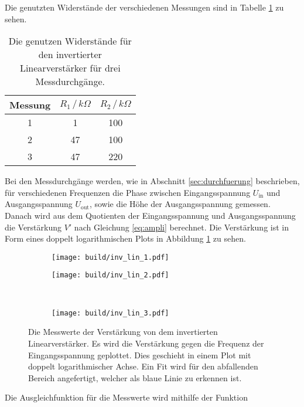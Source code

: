 Die genutzten Widerstände der verschiedenen Messungen sind in Tabelle \ref{tab:wider_inv_lin} zu sehen.
\begin{table}[H]
    \centering
    \begin{tabular}{ccc}
        \toprule
        Messung & $R_1 \, / \, k\Omega $ & $R_2 \, / \,  k\Omega $ \\
        \midrule 
        1 & 1 & 100 \\
        2 & 47 & 100 \\
        3 & 47 & 220 \\
        \bottomrule
    \end{tabular}
    \caption{Die genutzen Widerstände für den invertierter Linearverstärker für drei Messdurchgänge.}
    \label{tab:wider_inv_lin}
\end{table}
Bei den Messdurchgänge werden, wie in Abschnitt \ref{sec:durchfuerung} beschrieben, für verschiedenen Frequenzen die Phase zwischen Eingangsspannung $U_\text{in}$ und Ausgangsspannung $U_\text{out}$, sowie die Höhe der Ausgangsspannung gemessen.
Danach wird aus dem Quotienten der Eingangsspannung und Ausgangsspannung die Verstärkung $V'$ nach Gleichung \ref{eq:ampli} berechnet.
Die Verstärkung ist in Form eines doppelt logarithmischen Plots in Abbildung \ref{fig:inv_lin} zu sehen.
\begin{figure}[H]
    \centering
    \begin{subfigure}{0.49\linewidth}%
        \texttt{[image: build/inv\_lin\_1.pdf]}
    \end{subfigure}
    \hfill
    \begin{subfigure}{0.49\linewidth}%
        \texttt{[image: build/inv\_lin\_2.pdf]}
    \end{subfigure}\\
    \begin{subfigure}{0.49\linewidth}%
        \texttt{[image: build/inv\_lin\_3.pdf]}
    \end{subfigure}
    \caption{Die Messwerte der Verstärkung von dem invertierten Linearverstärker. Es wird die Verstärkung gegen die Frequenz der Eingangsspannung geplottet.
    Dies geschieht in einem Plot mit doppelt logarithmischer Achse. Ein Fit wird für den abfallenden Bereich angefertigt, welcher als blaue Linie zu erkennen ist.}
    \label{fig:inv_lin}
\end{figure}
Die Ausgleichfunktion für die Messwerte wird mithilfe der Funktion
